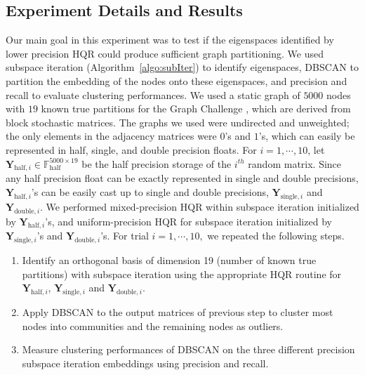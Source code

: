 \documentclass[review,onefignum,onetabnum]{siamart190516}
\newcommand{\F}{\mathbb{F}}
\newcommand{\bb}[1]{\mathbf{#1}}
\begin{document}
\subsection{Experiment Details and Results}
Our main goal in this experiment was to test if the eigenspaces identified by lower precision HQR could produce sufficient graph partitioning. 
We used subspace iteration (Algorithm~\ref{algo:subIter}) to identify eigenspaces, DBSCAN to partition the embedding of the nodes onto these eigenspaces, and precision and recall to evaluate clustering performances. 
We used a static graph of $5000$ nodes  with $19$ known true partitions for the Graph Challenge \cite{GraphChallenge}, which are derived from block stochastic matrices. 
The graphs we used were undirected and unweighted; the only elements in the adjacency matrices were $0$'s and $1$'s, which can easily be represented in half, single, and double precision floats. 
For $i=1, \cdots, 10$, let $\bb{Y}_{\text{half},i}\in\F_{\text{half}}^{5000\times 19}$ be the half precision storage of the $i^{th}$ random matrix.
Since any half precision float can be exactly represented in single and double precisions, $\bb{Y}_{\text{half},i}$'s can be easily cast up to single and double precisions, $\bb{Y}_{\text{single},i}$ and $\bb{Y}_{\text{double},i}$.
We performed mixed-precision HQR within subspace iteration initialized by $\bb{Y}_{\text{half},i}$'s, and uniform-precision HQR for subspace iteration initialized by $\bb{Y}_{\text{single},i}$'s  and $\bb{Y}_{\text{double},i}$'s.
For trial $i = 1, \cdots, 10, $ we repeated the following steps.
\begin{enumerate}[Step 1.]
	\item Identify an orthogonal basis of dimension 19 (number of known true partitions) with subspace iteration using the appropriate HQR routine for $\bb{Y}_{\text{half},i}$, $\bb{Y}_{\text{single},i}$ and $\bb{Y}_{\text{double},i}$.
	\item Apply DBSCAN to the output matrices of previous step to cluster most nodes into communities and the remaining nodes as outliers. 
	\item Measure clustering performances of DBSCAN on the three different precision subspace iteration embeddings using precision and recall.
\end{enumerate}
\end{document}
